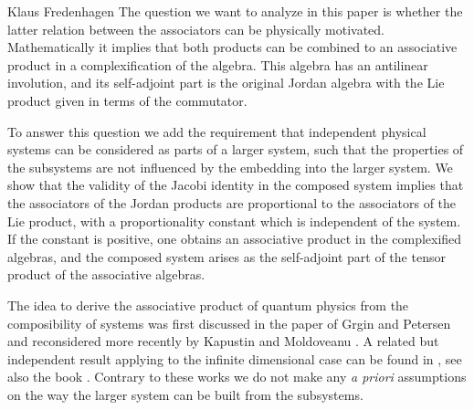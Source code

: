 \begin{artengenv}{Klaus Fredenhagen}
The question we want to analyze in this paper is whether the latter relation between the associators can be physically motivated. Mathematically it implies that both products can be combined to an associative product in a complexification of the algebra.
This algebra has an antilinear involution, and its self-adjoint part is the original Jordan algebra with the Lie product given in terms of the commutator.    

To answer this question we add the requirement that independent physical systems can be considered as parts of a larger system, such that the properties of the subsystems are not influenced by the embedding into the larger system. 
We show that the validity of the Jacobi identity in the composed system implies that the associators of the Jordan products are proportional to the associators of the Lie product, with a proportionality constant which is independent  of the system. If the constant is positive, one obtains an associative product in the complexified algebras, and the composed system arises as the self-adjoint part of the tensor product of the associative algebras. 

The idea to derive the associative product of quantum physics from the composibility of systems was first discussed in the paper of Grgin and Petersen \parencite*{P} and reconsidered more recently by Kapustin \parencite*{K} and Moldoveanu \parencite*{M}. 
 A related but independent result applying to the infinite dimensional case can be found in \parencite{H}, see also the book  \parencite{HS}. Contrary to these works we do not make any \textit{a priori} assumptions on the way the larger system can be built from the subsystems.
 
 
 
 
 
 

\end{artengenv}
